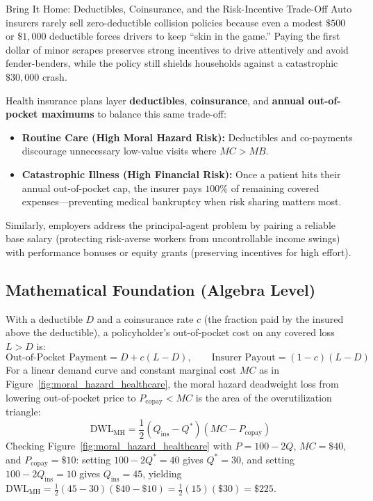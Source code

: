 \documentclass[11pt,letterpaper]{article}
\begin{document}
\begin{examplecase}{Bring It Home: Deductibles, Coinsurance, and the Risk-Incentive Trade-Off}
Auto insurers rarely sell zero-deductible collision policies because even a modest $\$500$ or $\$1{,}000$ deductible forces drivers to keep ``skin in the game.'' Paying the first dollar of minor scrapes preserves strong incentives to drive attentively and avoid fender-benders, while the policy still shields households against a catastrophic $\$30{,}000$ crash.

Health insurance plans layer \textbf{deductibles}, \textbf{coinsurance}, and \textbf{annual out-of-pocket maximums} to balance this same trade-off:
\begin{itemize}
    \item \textbf{Routine Care (High Moral Hazard Risk):} Deductibles and co-payments discourage unnecessary low-value visits where $MC > MB$.
    \item \textbf{Catastrophic Illness (High Financial Risk):} Once a patient hits their annual out-of-pocket cap, the insurer pays $100\%$ of remaining covered expenses—preventing medical bankruptcy when risk sharing matters most.
\end{itemize}
Similarly, employers address the principal-agent problem by pairing a reliable base salary (protecting risk-averse workers from uncontrollable income swings) with performance bonuses or equity grants (preserving incentives for high effort).
\end{examplecase}

\subsection*{Mathematical Foundation (Algebra Level)}
With a deductible $D$ and a coinsurance rate $c$ (the fraction paid by the insured above the deductible), a policyholder's out-of-pocket cost on any covered loss $L > D$ is:
\begin{equation}
\text{Out-of-Pocket Payment} = D + c(L - D), \qquad \text{Insurer Payout} = (1 - c)(L - D)
\end{equation}
For a linear demand curve and constant marginal cost $MC$ as in Figure~\ref{fig:moral_hazard_healthcare}, the moral hazard deadweight loss from lowering out-of-pocket price to $P_{\text{copay}} < MC$ is the area of the overutilization triangle:
\begin{equation}
\text{DWL}_{\text{MH}} = \frac{1}{2}(Q_{\text{ins}} - Q^*)(MC - P_{\text{copay}})
\end{equation}
Checking Figure~\ref{fig:moral_hazard_healthcare} with $P = 100 - 2Q$, $MC = \$40$, and $P_{\text{copay}} = \$10$: setting $100 - 2Q^* = 40$ gives $Q^* = 30$, and setting $100 - 2Q_{\text{ins}} = 10$ gives $Q_{\text{ins}} = 45$, yielding $\text{DWL}_{\text{MH}} = \frac{1}{2}(45 - 30)(\$40 - \$10) = \frac{1}{2}(15)(\$30) = \$225$.
\end{document}
